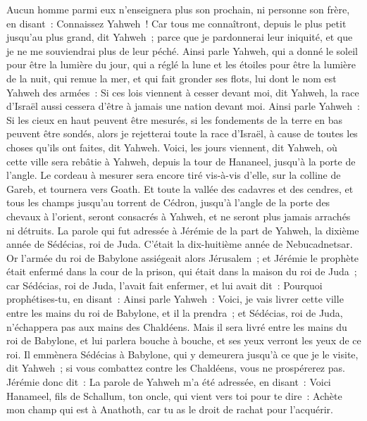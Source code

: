 \begin{multicols}{2}
Aucun homme parmi eux n'enseignera plus son prochain, ni personne son frère, en disant~: Connaissez Yahweh~! Car tous me connaîtront, depuis le plus petit jusqu'au plus grand, dit Yahweh~; parce que je pardonnerai leur iniquité, et que je ne me souviendrai plus de leur péché.
Ainsi parle Yahweh, qui a donné le soleil pour être la lumière du jour, qui a réglé la lune et les étoiles pour être la lumière de la nuit, qui remue la mer, et qui fait gronder ses flots, lui dont le nom est Yahweh des armées~:
Si ces lois viennent à cesser devant moi, dit Yahweh, la race d'Israël aussi cessera d'être à jamais une nation devant moi.
Ainsi parle Yahweh~: Si les cieux en haut peuvent être mesurés, si les fondements de la terre en bas peuvent être sondés, alors je rejetterai toute la race d'Israël, à cause de toutes les choses qu'ils ont faites, dit Yahweh.
Voici, les jours viennent, dit Yahweh, où cette ville sera rebâtie à Yahweh, depuis la tour de Hananeel, jusqu'à la porte de l'angle.
Le cordeau à mesurer sera encore tiré vis-à-vis d'elle, sur la colline de Gareb, et tournera vers Goath.
Et toute la vallée des cadavres et des cendres, et tous les champs jusqu'au torrent de Cédron, jusqu'à l'angle de la porte des chevaux à l'orient, seront consacrés à Yahweh, et ne seront plus jamais arrachés ni détruits.
\VerseOne{}La parole qui fut adressée à Jérémie de la part de Yahweh, la dixième année de Sédécias, roi de Juda. C'était la dix-huitième année de Nebucadnetsar.
Or l'armée du roi de Babylone assiégeait alors Jérusalem~; et Jérémie le prophète était enfermé dans la cour de la prison, qui était dans la maison du roi de Juda~;
car Sédécias, roi de Juda, l'avait fait enfermer, et lui avait dit~: Pourquoi prophétises-tu, en disant~: Ainsi parle Yahweh~: Voici, je vais livrer cette ville entre les mains du roi de Babylone, et il la prendra~;
et Sédécias, roi de Juda, n'échappera pas aux mains des Chaldéens. Mais il sera livré entre les mains du roi de Babylone, et lui parlera bouche à bouche, et ses yeux verront les yeux de ce roi.
Il emmènera Sédécias à Babylone, qui y demeurera jusqu'à ce que je le visite, dit Yahweh~; si vous combattez contre les Chaldéens, vous ne prospérerez pas.
Jérémie donc dit~: La parole de Yahweh m'a été adressée, en disant~:
Voici Hanameel, fils de Schallum, ton oncle, qui vient vers toi pour te dire~: Achète mon champ qui est à Anathoth, car tu as le droit de rachat pour l'acquérir.

\end{multicols}
